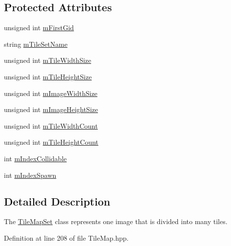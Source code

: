 \subsection*{Protected Attributes}
\begin{DoxyCompactItemize}
\item 
unsigned int \hyperlink{class_tile_map_set_aa30770be0b41115d5267c288c980d967}{m\-First\-Gid}
\item 
string \hyperlink{class_tile_map_set_a355b36e8f407752bd128b2a7d8babbba}{m\-Tile\-Set\-Name}
\item 
unsigned int \hyperlink{class_tile_map_set_ad1dee478b0dd00ff72a6635fd068b8cb}{m\-Tile\-Width\-Size}
\item 
unsigned int \hyperlink{class_tile_map_set_aa4620605087a8738afdfa4ef3e5fad99}{m\-Tile\-Height\-Size}
\item 
unsigned int \hyperlink{class_tile_map_set_ad70411018be2b8ce950e00b70020c703}{m\-Image\-Width\-Size}
\item 
unsigned int \hyperlink{class_tile_map_set_abf6e23ffe5ce47b8d25bd7e24e8bf386}{m\-Image\-Height\-Size}
\item 
unsigned int \hyperlink{class_tile_map_set_a53e0c59bfbd6285e0b0ca8f79a4af02c}{m\-Tile\-Width\-Count}
\item 
unsigned int \hyperlink{class_tile_map_set_a6bd7b84fef3fdd9fb1312e256ec55b4a}{m\-Tile\-Height\-Count}
\item 
int \hyperlink{class_tile_map_set_a02448f7bf82af58a2b660b7c4811479d}{m\-Index\-Collidable}
\item 
int \hyperlink{class_tile_map_set_abdcf3d4f5e9d82aeba620a7358068a42}{m\-Index\-Spawn}
\end{DoxyCompactItemize}


\subsection{Detailed Description}
The \hyperlink{class_tile_map_set}{Tile\-Map\-Set} class represents one image that is divided into many tiles. 

Definition at line 208 of file Tile\-Map.\-hpp.



